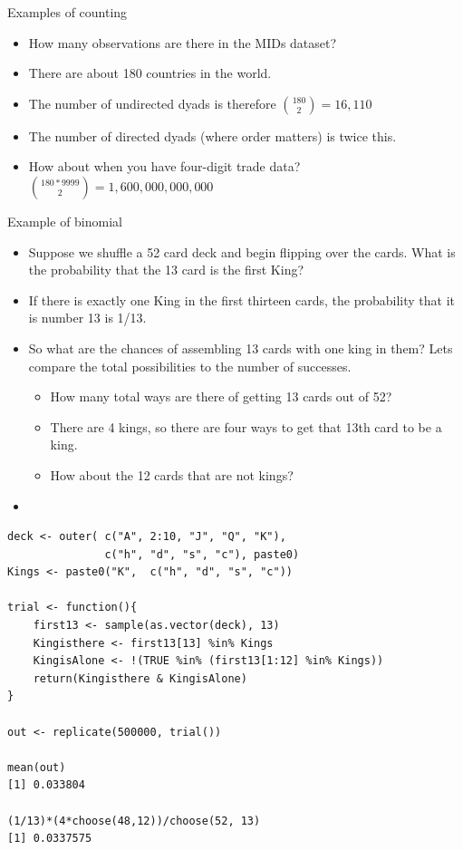 \documentclass{beamer}
\numberwithin{equation}{section}
\begin{document}
\begin{frame}{Examples of counting}
\begin{itemize}
\item How many observations are there in the MIDs dataset?\pause
\item There are about 180 countries in the world.
\item The number of undirected dyads is therefore ${{180}\choose{2}}=16,110$ 
\item The number of directed dyads (where order matters) is twice this.
\item How about when you have four-digit trade data? ${{180*9999}\choose{2}}=1,600,000,000,000$
\end{itemize}
\end{frame}


\begin{frame}{Example of binomial}
\begin{itemize}
\item Suppose we shuffle a 52 card deck and begin flipping over the cards.  What is the probability that the 13 card is the first King?\pause
\item If there is exactly one King in the first thirteen cards, the probability that it is number 13 is 1/13. \pause
\item So what are the chances of assembling 13 cards with one king in them?  Lets compare the total possibilities to the number of successes.\pause 
\begin{itemize}
\item How many total ways are there of getting 13 cards out of 52? \pause {}\pause
\item There are 4 kings, so there are four ways to get that 13th card to be a king. \pause
\item How about the 12 cards that are not kings?  \pause {}
\end{itemize}
\item \pause {}
\end{itemize}

\end{frame}

\begin{frame}[fragile]
\begin{verbatim}
deck <- outer( c("A", 2:10, "J", "Q", "K"), 
		       c("h", "d", "s", "c"), paste0)
Kings <- paste0("K",  c("h", "d", "s", "c"))

trial <- function(){
	first13 <- sample(as.vector(deck), 13)
	Kingisthere <- first13[13] %in% Kings 
	KingisAlone <- !(TRUE %in% (first13[1:12] %in% Kings))
	return(Kingisthere & KingisAlone)
}

out <- replicate(500000, trial())

mean(out)
[1] 0.033804

(1/13)*(4*choose(48,12))/choose(52, 13)
[1] 0.0337575
\end{verbatim}
\end{frame}
\end{document}
